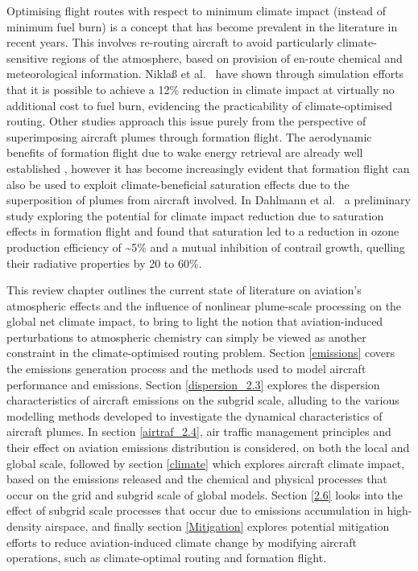 Optimising flight routes with respect to minimum climate impact (instead of minimum fuel burn) is a concept that has become prevalent in the literature in recent years. This involves re-routing aircraft to avoid particularly climate-sensitive regions of the atmosphere, based on provision of en-route chemical and meteorological information. Nikla{\ss} et al.\ \cite{Niklass2019a} have shown through simulation efforts that it is possible to achieve a 12\% reduction in climate impact at virtually no additional cost to fuel burn, evidencing the practicability of climate-optimised routing. Other studies approach this issue purely from the perspective of superimposing aircraft plumes through formation flight. The aerodynamic benefits of formation flight due to wake energy retrieval are already well established \cite{Bangash2004, Kent2020}, however it has become increasingly evident that formation flight can also be used to exploit climate-beneficial saturation effects due to the superposition of plumes from aircraft involved. In Dahlmann et al.\ \cite{Dahlmann2020} a preliminary study exploring the potential for climate impact reduction due to saturation effects in formation flight and found that  saturation led to a reduction in ozone production efficiency of \textasciitilde5\% and a mutual inhibition of contrail growth, quelling their radiative properties by 20 to 60\%. 

This review chapter outlines the current state of literature on aviation's atmospheric effects and the influence of nonlinear plume-scale processing on the global net climate impact, to bring to light the notion that aviation-induced perturbations to atmospheric chemistry can simply be viewed as another constraint in the climate-optimised routing problem. Section \ref{emissions} covers the emissions generation process and the methods used to model aircraft performance and emissions. Section \ref{dispersion_2.3} explores the dispersion characteristics of aircraft emissions on the subgrid scale, alluding to the various modelling methods developed to investigate the dynamical characteristics of aircraft plumes. In section \ref{airtraf_2.4}, air traffic management principles and their effect on aviation emissions distribution is considered, on both the local and global scale, followed by section \ref{climate} which explores aircraft climate impact, based on the emissions released and the chemical and physical processes that occur on the grid and subgrid scale of global models. Section \ref{2.6} looks into the effect of subgrid scale processes that occur due to emissions accumulation in high-density airspace, and finally section \ref{Mitigation} explores potential mitigation efforts to reduce aviation-induced climate change by modifying aircraft operations, such as climate-optimal routing and formation flight.